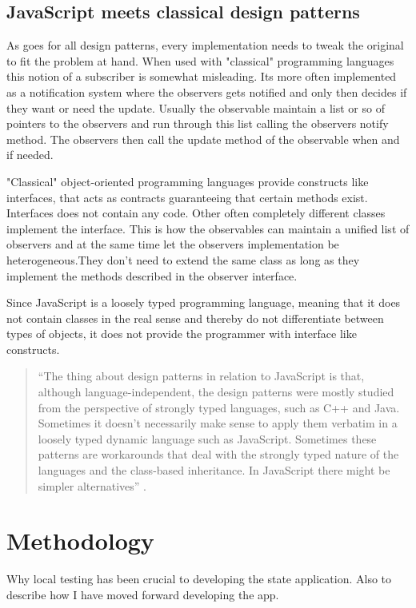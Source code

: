 \documentclass[english]{ifimaster}
\begin{document}
\section{JavaScript meets classical design patterns}
As goes for all design patterns, every implementation needs to tweak the original to fit the problem at hand. When used with "classical" programming languages this notion of a subscriber is somewhat misleading. Its more often implemented as a notification system where the observers gets notified and only then decides if they want or need the update. Usually the observable maintain a list or so of pointers to the observers and run through this list calling the observers notify method. The observers then call the update method of the observable when and if needed.

"Classical" object-oriented programming languages provide constructs like interfaces, that acts as contracts guaranteeing that certain methods exist. Interfaces does not contain any code. Other often completely different classes implement the interface. This is how the observables can maintain a unified list of observers and at the same time let the observers implementation be heterogeneous.They don't need to extend the same class as long as they implement the methods described in the observer interface. 

Since JavaScript is a loosely typed programming language, meaning that it does not contain classes in the real sense and thereby do not differentiate between types of objects, it does not provide the programmer with interface like constructs.  

\begin{quotation}
“The thing about design patterns in relation to JavaScript is that, although language-independent, the design patterns were mostly studied from the perspective of strongly typed languages, such as C++ and Java. Sometimes it doesn’t necessarily make sense to apply them verbatim in a loosely typed dynamic language such as JavaScript. Sometimes these patterns are workarounds that deal with the strongly typed nature of the languages and the class-based inheritance. In JavaScript there might be simpler alternatives” \parencite[s. 2]{stefanov}.
\end{quotation}

\chapter{Methodology}
Why local testing has been crucial to developing the state application. Also to describe how I have moved forward developing the app.
\end{document}
